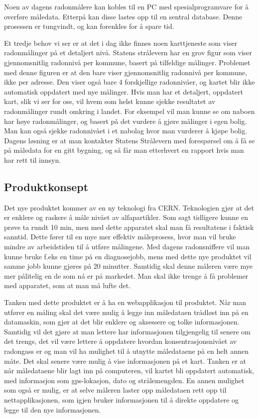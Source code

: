 Noen av dagens radonmålere kan kobles til en PC med spesialprogramvare for å overføre måledata. Etterpå kan disse lastes opp til en sentral database. Denne prosessen er tungvindt, og kan forenkles for å spare tid.

Et tredje behov vi ser er at det i dag ikke finnes noen karttjeneste som viser radonmålinger på et detaljert nivå. Statens strålevern har en grov figur som viser gjennomsnitlig radonnivå per kommune, basert på tilfeldige målinger. Problemet med denne figuren er at den bare viser gjennomsnitlig radonnivå per kommune, ikke per adresse. Den viser også bare 4 forskjellige radonnivåer, og kartet blir ikke automatisk oppdatert med nye målinger. Hvis man har et detaljert, oppdatert kart, slik vi ser for oss, vil hvem som helst kunne sjekke resultatet av radonmålinger rundt omkring i landet. For eksempel vil man kunne se om naboen har høye radonmålinger, og basert på det vurdere å gjøre målinger i egen bolig. Man kan også sjekke radonnivået i et nabolag hvor man vurderer å kjøpe bolig. Dagens løsning er at man kontakter Statens Strålevern med forespørsel om å få se på måledata for en gitt bygning, og så får man etterhvert en rapport hvis man har rett til innsyn.


\subsection{Produktkonsept}

Det nye produktet kommer av en ny teknologi fra CERN. Teknologien gjør at det er enklere og raskere å måle nivået av alfapartikler. Som sagt tidligere kunne en prøve ta rundt 10 min, men med dette apparatet skal man få resultatene i faktisk sanntid. Dette fører til en mye mer effektiv måleprosess, hvor man vil bruke mindre av arbeidstiden til å utføre målingene. Med dagens radonsniffere vil man kunne bruke f.eks en time på en diagnosejobb, mens med dette nye produktet vil samme jobb kunne gjøres på 20 minutter. Samtidig skal denne måleren være mye mer pålitelig en de som nå er på markedet. Man skal ikke trenge å få problemer med apparatet, som at man må lufte det.

Tanken med dette produktet er å ha en webapplikasjon til produktet. Når man utfører en måling skal det være mulig å legge inn måledataen trådløst inn på en datamaskin, som gjør at det blir enklere og aksessere og tolke informasjonen. Samtidig vil det gjøre at man lettere har informasjonen tilgjengelig til senere om det trengs, det vil være lettere å oppdatere hvordan konsentrasjonsnivået av radongass er og man vil ha mulighet til å utnytte måledataene på en helt annen måte. Det skal senere være mulig å vise informasjonen på et kart. Tanken er at når måledataene blir lagt inn på computeren, vil kartet bli oppdatert automatisk, med informasjon som gps-lokasjon, dato og strålemengden. En annen mulighet som også er mulig, er at selve måleren laster opp måledataen rett opp til nettapplikasjonen, som igjen bruker informasjonen til å direkte oppdatere og legge til den nye informasjonen.

